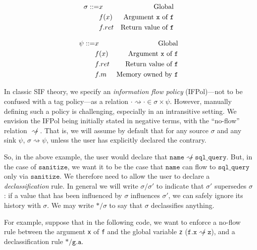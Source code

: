 \documentclass[acmsmall,review,anonymous]{acmart}\settopmatter{printfolios=true,printccs=false,printacmref=false}
\begin{document}
\begin{minipage}{0.5\textwidth}
  \[\begin{aligned}
  \sigma ::= & x & \textnormal{Global} \\
  & f(x) & \textnormal{Argument {\tt x} of {\tt f}} \\
  & f.ret & \textnormal{Return value of {\tt f}} \\
  \end{aligned}\]
\end{minipage}
\begin{minipage}{0.5\textwidth}
  \[\begin{aligned}
  \psi ::= & x & \textnormal{Global} \\
  & f(x) & \textnormal{Argument {\tt x} of {\tt f}} \\
  & f.ret & \textnormal{Return value of {\tt f}} \\
  & f.m & \textnormal{Memory owned by {\tt f}} \\
  \end{aligned}\]
\end{minipage}

In classic SIF theory, we specify an {\em information flow policy} (IFPol)---not to be confused with a
tag policy---as a relation \(\cdot \rightsquigarrow \cdot \in \sigma \times \psi\). However,
manually defining such a policy is challenging, especially in an intransitive setting.
We envision the IFPol being initially stated in negative terms, with the ``no-flow'' relation
\(\not \rightsquigarrow\). That is, we will assume by default that for any source \(\sigma\)
and any sink \(\psi\), \(\sigma \rightsquigarrow \psi\), unless the user has explicitly
declared the contrary.

So, in the above example, the user would declare that \(\mathtt{name} \not \rightsquigarrow \mathtt{sql\_query}\).
But, in the case of \(\mathtt{sanitize}\), we want it to be the case that \(\mathtt{name}\) can flow to
\(\mathtt{sql\_query}\) only via \(\mathtt{sanitize}\). We therefore need to allow the user to declare
a {\em declassification} rule. In general we will write \(\sigma / \sigma'\) to indicate that \(\sigma'\)
supersedes \(\sigma\): if a value that has been influenced by \(\sigma\) influences \(\sigma'\), we
can safely ignore its history with \(\sigma\). We may write \(* / \sigma\) to say that \(\sigma\)
declassifies anything.

For example, suppose that in the following code, we want to enforce a no-flow rule between
the argument {\tt x} of {\tt f} and the global variable {\tt z}
(\(\mathtt{f.x} \not \rightsquigarrow \mathtt{z}\)), and a declassification rule
\(* / \mathtt{g.a}\).
\end{document}
